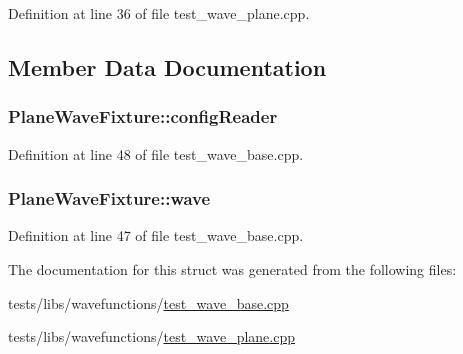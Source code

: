 Definition at line 36 of file test\-\_\-wave\-\_\-plane.\-cpp.



\subsection{Member Data Documentation}
\hypertarget{struct_plane_wave_fixture_a6b8426254e473489b6bc3784e6552462}{
\subsubsection[{config\-Reader}]{ Plane\-Wave\-Fixture\-::config\-Reader}}\label{struct_plane_wave_fixture_a6b8426254e473489b6bc3784e6552462}


Definition at line 48 of file test\-\_\-wave\-\_\-base.\-cpp.

\hypertarget{struct_plane_wave_fixture_aba9bfc7d583ff61a51ac04f3c4bacfd1}{
\subsubsection[{wave}]{ Plane\-Wave\-Fixture\-::wave}}\label{struct_plane_wave_fixture_aba9bfc7d583ff61a51ac04f3c4bacfd1}


Definition at line 47 of file test\-\_\-wave\-\_\-base.\-cpp.



The documentation for this struct was generated from the following files\-:\begin{DoxyCompactItemize}
\item 
tests/libs/wavefunctions/\hyperlink{test__wave__base_8cpp}{test\-\_\-wave\-\_\-base.\-cpp}\item 
tests/libs/wavefunctions/\hyperlink{test__wave__plane_8cpp}{test\-\_\-wave\-\_\-plane.\-cpp}\end{DoxyCompactItemize}
